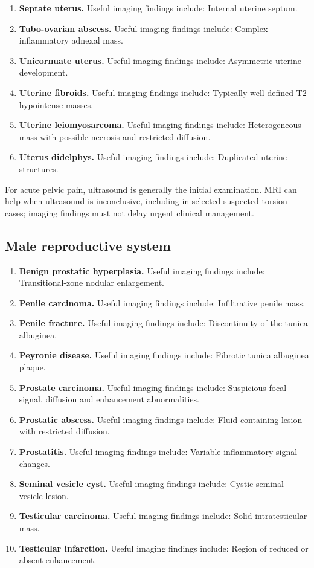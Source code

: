 \begin{enumerate}[leftmargin=*,itemsep=0.45em,topsep=0.4em]
\item \textbf{Septate uterus.} Useful imaging findings include: Internal uterine septum.
\item \textbf{Tubo-ovarian abscess.} Useful imaging findings include: Complex inflammatory adnexal mass.
\item \textbf{Unicornuate uterus.} Useful imaging findings include: Asymmetric uterine development.
\item \textbf{Uterine fibroids.} Useful imaging findings include: Typically well-defined T2 hypointense masses.
\item \textbf{Uterine leiomyosarcoma.} Useful imaging findings include: Heterogeneous mass with possible necrosis and restricted diffusion.
\item \textbf{Uterus didelphys.} Useful imaging findings include: Duplicated uterine structures.
\end{enumerate}

For acute pelvic pain, ultrasound is generally the initial examination. MRI can help when ultrasound is inconclusive, including in selected suspected torsion cases; imaging findings must not delay urgent clinical management.

\subsection{Male reproductive system}
\begin{enumerate}[leftmargin=*,itemsep=0.45em,topsep=0.4em]
\item \textbf{Benign prostatic hyperplasia.} Useful imaging findings include: Transitional-zone nodular enlargement.
\item \textbf{Penile carcinoma.} Useful imaging findings include: Infiltrative penile mass.
\item \textbf{Penile fracture.} Useful imaging findings include: Discontinuity of the tunica albuginea.
\item \textbf{Peyronie disease.} Useful imaging findings include: Fibrotic tunica albuginea plaque.
\item \textbf{Prostate carcinoma.} Useful imaging findings include: Suspicious focal signal, diffusion and enhancement abnormalities.
\item \textbf{Prostatic abscess.} Useful imaging findings include: Fluid-containing lesion with restricted diffusion.
\item \textbf{Prostatitis.} Useful imaging findings include: Variable inflammatory signal changes.
\item \textbf{Seminal vesicle cyst.} Useful imaging findings include: Cystic seminal vesicle lesion.
\item \textbf{Testicular carcinoma.} Useful imaging findings include: Solid intratesticular mass.
\item \textbf{Testicular infarction.} Useful imaging findings include: Region of reduced or absent enhancement.
\end{enumerate}

